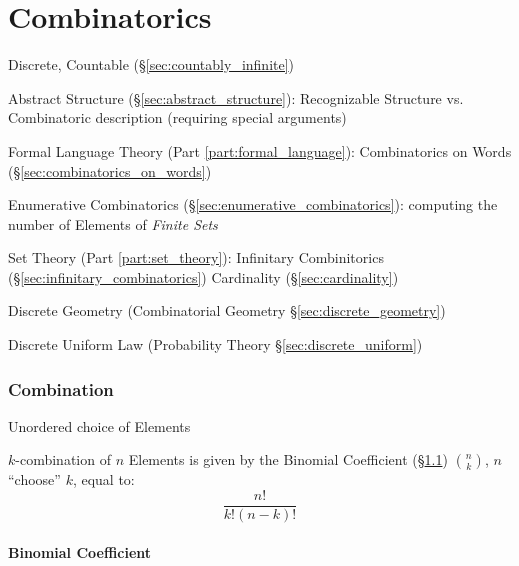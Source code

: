\part{Combinatorics}\label{part:combinatorics}

Discrete, Countable (\S\ref{sec:countably_infinite})

Abstract Structure (\S\ref{sec:abstract_structure}): Recognizable
Structure vs. Combinatoric description (requiring special arguments)

Formal Language Theory (Part \ref{part:formal_language}):
Combinatorics on Words (\S\ref{sec:combinatorics_on_words})

Enumerative Combinatorics (\S\ref{sec:enumerative_combinatorics}): computing
the number of Elements of \emph{Finite Sets}

Set Theory (Part \ref{part:set_theory}): Infinitary Combinitorics
(\S\ref{sec:infinitary_combinatorics}) \fist Cardinality
(\S\ref{sec:cardinality})

\fist Discrete Geometry (Combinatorial Geometry \S\ref{sec:discrete_geometry})

\fist Discrete Uniform Law (Probability Theory \S\ref{sec:discrete_uniform})



\section{Combination}\label{sec:combination}

Unordered choice of Elements

$k$-combination of $n$ Elements is given by the Binomial Coefficient
(\S\ref{sec:binomial_coefficient}) $\binom{n}{k}$, $n$ ``choose'' $k$,
equal to:
\[
  \frac{n!}{k!(n - k)!}
\]



\subsection{Binomial Coefficient}\label{sec:binomial_coefficient}

